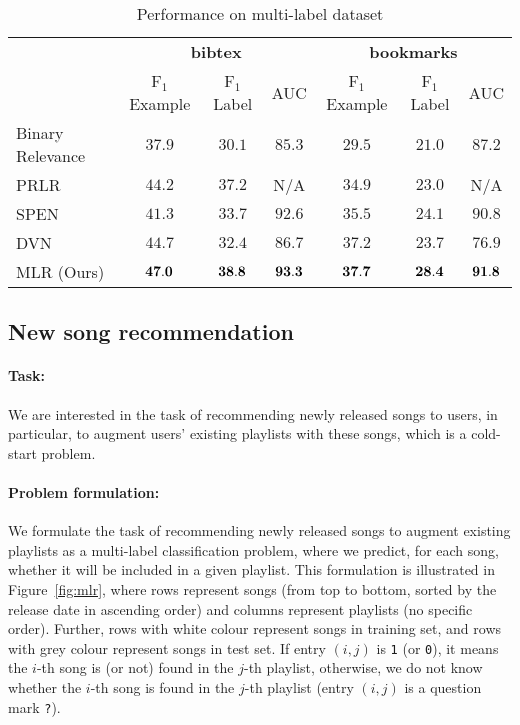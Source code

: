 \begin{table}[!h]
\centering
\caption{Performance on multi-label dataset}
\label{tab:perf_mlc}
\setlength{\tabcolsep}{2pt} %
\begin{tabular}{l|ccc|ccc}
\toprule
{} & \multicolumn{3}{c|}{\textbf{bibtex}} & \multicolumn{3}{c}{\textbf{bookmarks}} \\
{} &   F$_1$ Example & F$_1$ Label &    AUC &      F$_1$ Example & F$_1$ Label &    AUC \\
\midrule
Binary Relevance~\cite{}           &          $37.9$ &      $30.1$ & $85.3$ &             $29.5$ &      $21.0$ & $87.2$ \\
PRLR~\cite{lin2014multi}           &          $44.2$ &      $37.2$ &    N/A &             $34.9$ &      $23.0$ &    N/A \\
SPEN~\cite{belanger2016structured} &          $41.3$ &      $33.7$ & $92.6$ &             $35.5$ &      $24.1$ & $90.8$ \\
DVN~\cite{gygli2017deep}           &          $44.7$ &      $32.4$ & $86.7$ &             $37.2$ &      $23.7$ & $76.9$ \\
MLR (Ours)                         &          ${\bf 47.0}$ & ${\bf 38.8}$ & ${\bf 93.3}$ & ${\bf 37.7}$ & ${\bf 28.4}$ & ${\bf 91.8}$ \\
\bottomrule
\end{tabular}
\end{table}



\subsection{New song recommendation}
\label{ssec:newsongrec}

\paragraph{Task:} 
We are interested in the task of recommending newly released songs to users,
in particular, to augment users' existing playlists with these songs,
which is a cold-start problem.

\paragraph{Problem formulation:}
We formulate the task of recommending newly released songs to augment existing playlists
as a multi-label classification problem, where we predict, for each song, 
whether it will be included in a given playlist.
This formulation is illustrated in Figure~\ref{fig:mlr},
where rows represent songs (from top to bottom, sorted by the release date in ascending order)
and columns represent playlists (no specific order).
Further, rows with white colour represent songs in training set, and rows with grey colour represent songs in test set.
If entry $(i, j)$ is \texttt{1} (or \texttt{0}), it means the $i$-th song is (or not) found in the $j$-th playlist,
otherwise, we do not know whether the $i$-th song is found in the $j$-th playlist (\ie entry $(i, j)$ is a question mark \texttt{?}).


